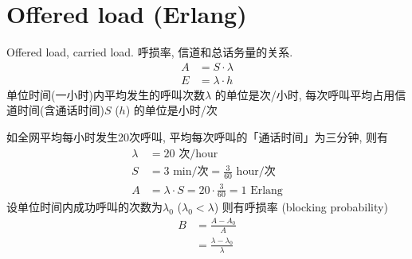 \documentclass[a4paper]{report}
\begin{document}
\section{Offered load (Erlang)} 
Offered load, carried load. 呼损率, 信道和总话务量的关系. 
\begin{align*}
	A &= S \cdot \lambda \\
	E & = \lambda \cdot h
\end{align*}
单位时间(一小时)内平均发生的呼叫次数$\lambda$ 的单位是次/小时, 每次呼叫平均占用信道时间(含通话时间)$S$ ($h$) 的单位是小时/次

如全网平均每小时发生20次呼叫, 平均每次呼叫的「通话时间」为三分钟, 则有
\begin{align*}
	\lambda&=20 \text{ 次/hour} \\
	S &= 3 \text{ min/次} = \frac{3}{60} \text{ hour/次} \\
	A &= \lambda \cdot S = 20 \cdot \frac{3}{60} = 1 \text{ Erlang}
\end{align*}
设单位时间内成功呼叫的次数为$\lambda_0$ ($\lambda_0<\lambda$) 则有呼损率 (blocking probability)
\begin{align*}
	B &= \frac{A-A_0}{A} \\
	&=\frac{\lambda-\lambda_0}{\lambda}
\end{align*}
\end{document}
